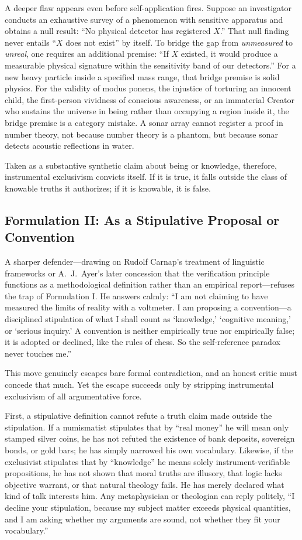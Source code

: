 A deeper flaw appears even before self-application fires. Suppose an investigator conducts an exhaustive survey of a phenomenon with sensitive apparatus and obtains a null result: ``No physical detector has registered $X$.'' That null finding never entails ``$X$ does not exist'' by itself. To bridge the gap from \emph{unmeasured} to \emph{unreal}, one requires an additional premise: ``If $X$ existed, it would produce a measurable physical signature within the sensitivity band of our detectors.'' For a new heavy particle inside a specified mass range, that bridge premise is solid physics. For the validity of modus ponens, the injustice of torturing an innocent child, the first-person vividness of conscious awareness, or an immaterial Creator who sustains the universe in being rather than occupying a region inside it, the bridge premise is a category mistake. A sonar array cannot register a proof in number theory, not because number theory is a phantom, but because sonar detects acoustic reflections in water.

Taken as a substantive synthetic claim about being or knowledge, therefore, instrumental exclusivism convicts itself. If it is true, it falls outside the class of knowable truths it authorizes; if it is knowable, it is false.

\subsection{Formulation II: As a Stipulative Proposal or Convention}

A sharper defender---drawing on Rudolf Carnap's treatment of linguistic frameworks or A.\ J.\ Ayer's later concession that the verification principle functions as a methodological definition rather than an empirical report---refuses the trap of Formulation I. He answers calmly: ``I am not claiming to have measured the limits of reality with a voltmeter. I am proposing a convention---a disciplined stipulation of what I shall count as `knowledge,' `cognitive meaning,' or `serious inquiry.' A convention is neither empirically true nor empirically false; it is adopted or declined, like the rules of chess. So the self-reference paradox never touches me.''

This move genuinely escapes bare formal contradiction, and an honest critic must concede that much. Yet the escape succeeds only by stripping instrumental exclusivism of all argumentative force.

First, a stipulative definition cannot refute a truth claim made outside the stipulation. If a numismatist stipulates that by ``real money'' he will mean only stamped silver coins, he has not refuted the existence of bank deposits, sovereign bonds, or gold bars; he has simply narrowed his own vocabulary. Likewise, if the exclusivist stipulates that by ``knowledge'' he means solely instrument-verifiable propositions, he has not shown that moral truths are illusory, that logic lacks objective warrant, or that natural theology fails. He has merely declared what kind of talk interests him. Any metaphysician or theologian can reply politely, ``I decline your stipulation, because my subject matter exceeds physical quantities, and I am asking whether my arguments are sound, not whether they fit your vocabulary.''

